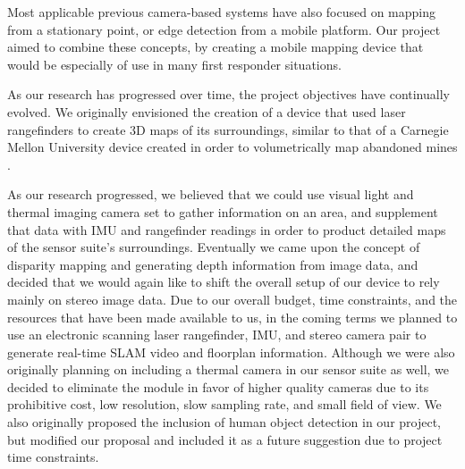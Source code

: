 Most applicable previous camera-based systems have also focused on mapping from a stationary point, or edge detection from a mobile platform. Our project aimed to combine these concepts, by creating a mobile mapping device that would be especially of use in many first responder situations.
\par
As our research has progressed over time, the project objectives have continually evolved. We originally envisioned the creation of a device that used laser rangefinders to create 3D maps of its surroundings, similar to that of a Carnegie Mellon University device created in order to volumetrically map abandoned mines \cite{thrun}.
\par
As our research progressed, we believed that we could use visual light and thermal imaging camera set to gather information on an area, and supplement that data with IMU and rangefinder readings in order to product detailed maps of the sensor suite's surroundings. Eventually we came upon the concept of disparity mapping and generating depth information from image data, and decided that we would again like to shift the overall setup of our device to rely mainly on stereo image data. Due to our overall budget, time constraints, and the resources that have been made available to us, in the coming terms we planned to use an electronic scanning laser rangefinder, IMU, and stereo camera pair to generate real-time SLAM video and floorplan information. Although we were also originally planning on including a thermal camera in our sensor suite as well, we decided to eliminate the module in favor of higher quality cameras due to its prohibitive cost, low resolution, slow sampling rate, and small field of view. We also originally proposed the inclusion of human object detection in our project, but modified our proposal and included it as a future suggestion due to project time constraints.




